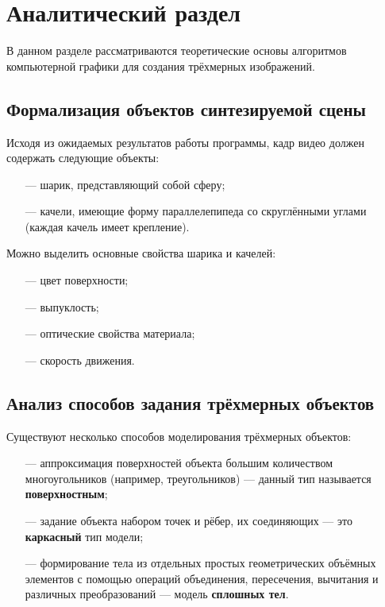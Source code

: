 \chapter{Аналитический раздел}
\fontsize{16}{19}\selectfont

В данном разделе рассматриваются теоретические основы алгоритмов компьютерной графики для создания трёхмерных изображений.

\section{Формализация объектов синтезируемой сцены}

Исходя из ожидаемых результатов работы программы, кадр видео должен содержать следующие объекты:
\begin{itemize}
	\item[---] шарик, представляющий собой сферу;
	\item[---] качели, имеющие форму параллелепипеда со скруглёнными углами (каждая качель имеет крепление).
\end{itemize}

Можно выделить основные свойства шарика и качелей:
\begin{itemize}
	\item[---] цвет поверхности;
	\item[---] выпуклость;
	\item[---] оптические свойства материала;
	\item[---] скорость движения.
\end{itemize}

\section{Анализ способов задания трёхмерных объектов}
Существуют несколько способов моделирования трёхмерных объектов:
\begin{itemize}
	\item[---] аппроксимация поверхностей объекта большим количеством многоугольников (например, треугольников) --- данный тип называется \textbf{поверхностным};
	\item[---] задание объекта набором точек и рёбер, их соединяющих --- это \textbf{каркасный} тип модели;
	\item[---] формирование тела  из отдельных простых геометрических объёмных элементов с помощью операций объединения, пересечения, вычитания и различных преобразований --- модель \textbf{сплошных тел}.
\end{itemize}

